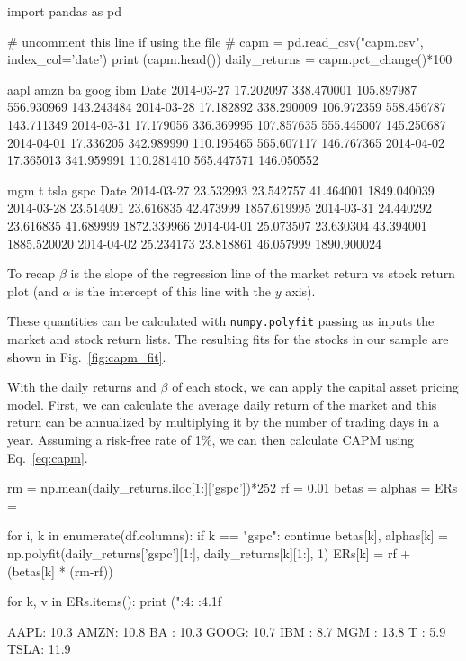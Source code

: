 \begin{ipython}
import pandas as pd

# uncomment this line if using the file
# capm = pd.read_csv("capm.csv", index_col='date')
print (capm.head())
daily_returns = capm.pct_change()*100
\end{ipython}
\begin{ioutput}
                 aapl        amzn          ba        goog         ibm
Date                                                                    
2014-03-27  17.202097  338.470001  105.897987  556.930969  143.243484   
2014-03-28  17.182892  338.290009  106.972359  558.456787  143.711349   
2014-03-31  17.179056  336.369995  107.857635  555.445007  145.250687   
2014-04-01  17.336205  342.989990  110.195465  565.607117  146.767365   
2014-04-02  17.365013  341.959991  110.281410  565.447571  146.050552   

                  mgm          t       tsla         gspc  
Date                                                      
2014-03-27  23.532993  23.542757  41.464001  1849.040039  
2014-03-28  23.514091  23.616835  42.473999  1857.619995  
2014-03-31  24.440292  23.616835  41.689999  1872.339966  
2014-04-01  25.073507  23.630304  43.394001  1885.520020  
2014-04-02  25.234173  23.818861  46.057999  1890.900024  
\end{ioutput}

To recap $\beta$ is the slope of the regression line of the market return vs stock return plot (and $\alpha$ is the intercept of this line with the $y$ axis).

These quantities can be calculated with \texttt{numpy.polyfit} passing as inputs the market and stock return lists. 
The resulting fits for the stocks in our sample are shown in Fig.~\ref{fig:capm_fit}.

With the daily returns and $\beta$ of each stock, we can apply the capital asset pricing model. First, we can calculate the average daily return of the market and this return can be annualized by multiplying it by the number of trading days in a year.
Assuming a risk-free rate of 1\%, we can then calculate CAPM using Eq.~\ref{eq:capm}.

\begin{ipython}
rm = np.mean(daily_returns.iloc[1:]['gspc'])*252
rf = 0.01
betas = {}
alphas = {}
ERs = {}

for i, k in enumerate(df.columns):
    if k == "gspc":
        continue
    betas[k], alphas[k] = np.polyfit(daily_returns['gspc'][1:],
    daily_returns[k][1:], 1)
    ERs[k] = rf + (betas[k] * (rm-rf))

for k, v in ERs.items():
    print ("{:4}: {:4.1f}%
\end{ipython}
\begin{ioutput}
AAPL: 10.3%
AMZN: 10.8%
BA  : 10.3%
GOOG: 10.7%
IBM :  8.7%
MGM : 13.8%
T   :  5.9%
TSLA: 11.9%
\end{ioutput}

